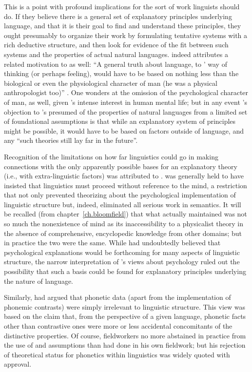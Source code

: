 This is a point with profound implications for the sort of work
linguists should do. If they believe there is a general set of
explanatory principles underlying language, and that it is their goal
to find and understand these principles, they ought presumably to
organize their work by formulating tentative systems with a rich
deductive structure, and then look for evidence of the fit between
such systems and the properties of actual natural languages. {\Joos}
indeed attributes a related motivation to {\Boas} as well: ``A general
truth about language, to {\Boas}' way of thinking (or perhaps feeling),
would have to be based on nothing less than the biological or even the
physiological character of man (he was a physical anthropologist too)''
\citep[v]{joos57:readings}. One wonders at the omission of the
psychological character of man, as well, given {\Boas}'s intense interest
in human mental life; but in any event {\Joos}'s objection to {\Boas}'s
presumed  of the properties of natural languages from a
limited set of foundational assumptions is that while an explanatory
system of principles might be possible, it would have to be based on
factors outside of language, and any ``such theories still lay far in
the future''.

Recognition of the limitations on how far linguistics could go in
making connections with the only apparently possible bases for an
explanatory theory (i.e., with extra-linguistic factors) was attributed
to {\Bloomfield}. {\Bloomfield} was generally held to have insisted that
linguistics must proceed without reference to the mind, a restriction
that not only prevented theorizing about the psychological
implementation of linguistic structure but, indeed, eliminated all
serious work in semantics. It will be recalled (from
chapter~\ref{ch.bloomfield}) that what {\Bloomfield} actually maintained
was not so much the nonexistence of mind as its inaccessibility to a
physicalist theory in the absence of comprehensive, encyclopedic
knowledge from other domains; but in practice the two were the
same. While {\Boas} had undoubtedly believed that psychological
explanations would be forthcoming for many aspects of linguistic
structure, the narrow interpretation of {\Bloomfield}'s views about
psychology ruled out the possibility that such a basis could be found
for explanatory principles underlying the nature of language.

Similarly, {\Bloomfield} had argued that phonetic data (apart from the
implementation of phonemic contrasts) were simply irrelevant to
linguistic structure. This view was based on the claim that, from the
perspective of a given language, phonetic facts other than contrastive
ones were more or less accidental concomitants of the distinctive
properties. Of course, fieldworkers no more abstained in practice from
the use of  and assumptions than {\Bloomfield}
had done in his own fieldwork; but his rejection of theoretical status
for phonetics within linguistics was widely quoted with approval.

